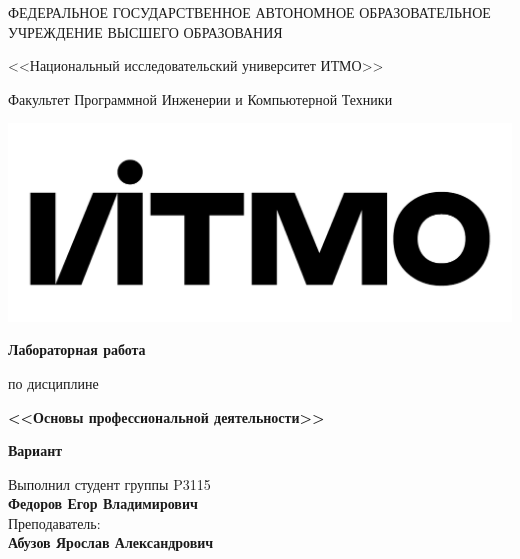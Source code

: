 \begin{titlepage}
    \thispagestyle{firststyle}
    \begin{center}

       ФЕДЕРАЛЬНОЕ ГОСУДАРСТВЕННОЕ АВТОНОМНОЕ ОБРАЗОВАТЕЛЬНОЕ УЧРЕЖДЕНИЕ ВЫСШЕГО ОБРАЗОВАНИЯ
        \vspace{0.5cm}

        <<Национальный исследовательский университет ИТМО>>

        Факультет Программной Инженерии и Компьютерной Техники

        \vspace{1cm}


        \includegraphics[scale=0.1]{img/itmo_logo.png}

    \end{center}

    \vspace{1cm}

    \begin{center}
        \large
        \textbf{Лабораторная работа }

        по дисциплине
        
        \textbf{<<Основы профессиональной деятельности>>}

        \textbf{Вариант }
    \end{center}

    \vspace{2cm}

    \begin{flushright}
        Выполнил студент  группы P3115\\
        \textbf{Федоров Егор Владимирович} \\
        Преподаватель: \\
        \textbf{Абузов Ярослав Александрович}\\
    \end{flushright}

\end{titlepage}
